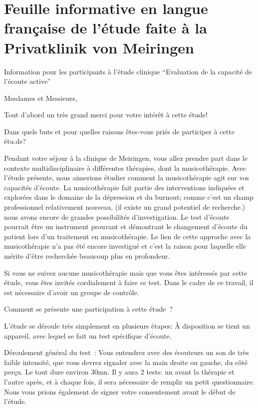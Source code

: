 
\section{Feuille informative en langue française de l'étude faite à la Privatklinik von Meiringen}

Information pour les participants à l'étude clinique
\foreignquote{french}{Evaluation de la capacité de l'écoute active}


Mesdames et Messieurs,

Tout d'abord un très grand merci pour votre intérêt à cette étude!

Dans quels buts et pour quelles raisons êtes-vous priés de 
par\-ti\-ci\-per à cet\-te étu\-.de?

Pendant votre séjour à la clinique de Meiringen, vous allez prendre
part dans le contexte multidisciplinaire à différentes thérapies, dont
la musicothérapie. Avec l'étude présente, nous aimerions étudier comment
la musicothérapie agit sur vos capacités d'écoute.
La musicothérapie fait partie des interventions indiquées et explorées dans le domaine
de la dépression et du burnout; comme c'est un champ
professionnel
relativement nouveau, (il existe un grand potentiel de recherche.) nous avons encore de grandes possibilités d'investigation.
Le test d'écoute pourrait être un instrument prouvant et démontrant le changement
d'écoute du patient lors d'un traitement en musicothérapie.
Le lien de cette approche avec la musicothérapie n'a pas été encore
investigué et c'est la raison pour laquelle elle mérite d'être
recherchée beaucoup plus en profondeur.

Si vous ne suivez aucune musicothérapie mais que vous êtes intéressés
par cette étude, vous êtes invités cordialement à faire ce test. Dans
le cadre de ce travail, il est nécessaire d'avoir un groupe de contrôle.

Comment se présente une participation à cette étude ?

L'étude se déroule très simplement en plusieurs étapes:
À disposition se tient un appareil, avec lequel se fait un test spécifique d'écoute.

Déroulement général du test :
Vous entendrez  avec des écouteurs un son de très faible intensité, que
vous devrez signaler avec la main droite ou gauche, du côté
perçu.
Le tout dure environ 30mn.
Il y aura 2 tests: un avant la thérapie et l'autre après, et à chaque
fois, il sera nécessaire de remplir un petit questionnaire.
Nous vous prions également de signer votre consentement avant le début
de l'étude.


